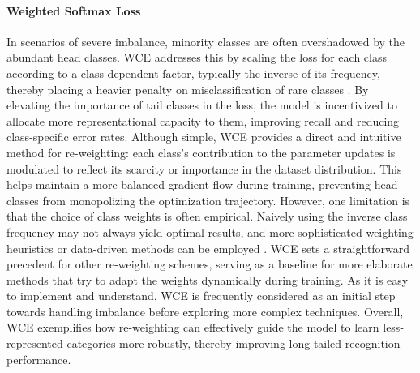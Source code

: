 \paragraph{Weighted Softmax Loss}
In scenarios of severe imbalance, minority classes are often overshadowed by the abundant head classes. WCE addresses this by scaling the loss for each class according to a class-dependent factor, typically the inverse of its frequency, thereby placing a heavier penalty on misclassification of rare classes \cite{zhang2023deep}. By elevating the importance of tail classes in the loss, the model is incentivized to allocate more representational capacity to them, improving recall and reducing class-specific error rates. Although simple, WCE provides a direct and intuitive method for re-weighting: each class’s contribution to the parameter updates is modulated to reflect its scarcity or importance in the dataset distribution. This helps maintain a more balanced gradient flow during training, preventing head classes from monopolizing the optimization trajectory. However, one limitation is that the choice of class weights is often empirical. Naively using the inverse class frequency may not always yield optimal results, and more sophisticated weighting heuristics or data-driven methods can be employed \cite{zhang2023deep}. WCE sets a straightforward precedent for other re-weighting schemes, serving as a baseline for more elaborate methods that try to adapt the weights dynamically during training. As it is easy to implement and understand, WCE is frequently considered as an initial step towards handling imbalance before exploring more complex techniques. Overall, WCE exemplifies how re-weighting can effectively guide the model to learn less-represented categories more robustly, thereby improving long-tailed recognition performance.

